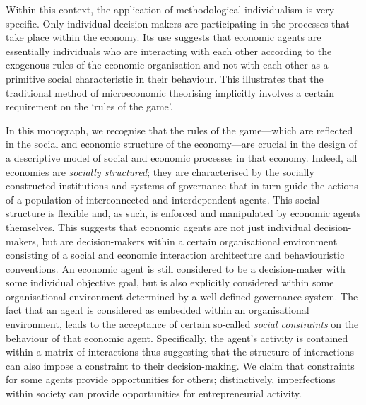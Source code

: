 Within this context, the application of methodological individualism is very specific. Only individual decision-makers are participating in the processes that take place within the economy. Its use suggests that economic agents are essentially individuals who are interacting with each other according to the exogenous rules of the economic organisation and not with each other as a primitive social characteristic in their behaviour. This illustrates that the traditional method of microeconomic theorising implicitly involves a certain requirement on the `rules of the game'. 

In this monograph, we recognise that the rules of the game---which are reflected in the social and economic structure of the economy---are crucial in the design of a descriptive model of social and economic processes in that economy. Indeed, all economies are \emph{socially structured}; they are characterised by the socially constructed institutions and systems of governance that in turn guide the actions of a population of interconnected and interdependent agents. This social structure is flexible and, as such, is enforced and manipulated by economic agents themselves. This suggests that economic agents are not just individual decision-makers, but are decision-makers within a certain organisational environment consisting of a social and economic interaction architecture and behaviouristic conventions. An economic agent is still considered to be a decision-maker with some individual objective goal, but is also explicitly considered within some organisational environment determined by a well-defined governance system. The fact that an agent is considered as embedded within an organisational environment, leads to the acceptance of certain so-called \emph{social constraints} on the behaviour of that economic agent. Specifically, the agent's activity is contained within a matrix of interactions thus suggesting that the structure of interactions can also impose a constraint to their decision-making. We claim that constraints for some agents provide opportunities for others; distinctively, imperfections within society can provide opportunities for entrepreneurial activity.

